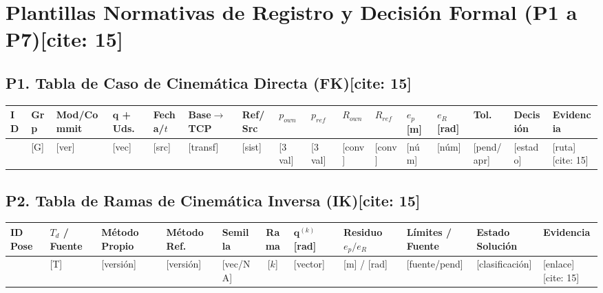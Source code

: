 \documentclass[10pt, a4paper]{article}
\begin{document}
\section{Plantillas Normativas de Registro y Decisión Formal (P1 a P7)[cite: 15]}

\subsection*{P1. Tabla de Caso de Cinemática Directa (FK)[cite: 15]}
\noindent
{\tiny
\renewcommand{\arraystretch}{1.35}
\noindent\begin{tabularx}{\textwidth}{|l|l|l|X|l|l|l|l|l|l|l|l|l|l|l|X|}
\hline
\rowcolor{ucbblue!15}
\textbf{ID} & \textbf{Grp} & \textbf{Mod/Commit} & $\mathbf{q}$ \textbf{+ Uds.} & \textbf{Fecha/$t$} & \textbf{Base$\to$TCP} & \textbf{Ref/Src} & $p_{own}$ & $p_{ref}$ & $R_{own}$ & $R_{ref}$ & $e_p$ [m] & $e_R$ [rad] & \textbf{Tol.} & \textbf{Decisión} & \textbf{Evidencia} \\ \hline
[ID] & [G] & [ver] & [vec] & [src] & [transf] & [sist] & [3 val] & [3 val] & [conv] & [conv] & [núm] & [núm] & [pend/apr] & [estado] & [ruta][cite: 15] \\ \hline
\end{tabularx}
}

\subsection*{P2. Tabla de Ramas de Cinemática Inversa (IK)[cite: 15]}
\noindent
{\tiny
\renewcommand{\arraystretch}{1.35}
\noindent\begin{tabularx}{\textwidth}{|l|l|l|l|l|c|X|l|l|l|X|}
\hline
\rowcolor{ucbblue!15}
\textbf{ID Pose} & $T_d$ / \textbf{Fuente} & \textbf{Método Propio} & \textbf{Método Ref.} & \textbf{Semilla} & \textbf{Rama} & $\mathbf{q}^{(k)}$ [rad] & \textbf{Residuo} $e_p / e_R$ & \textbf{Límites / Fuente} & \textbf{Estado Solución} & \textbf{Evidencia} \\ \hline
[ID] & [T] & [versión] & [versión] & [vec/NA] & [$k$] & [vector] & [m] / [rad] & [fuente/pend] & [clasificación] & [enlace][cite: 15] \\ \hline
\end{tabularx}
}
\end{document}
